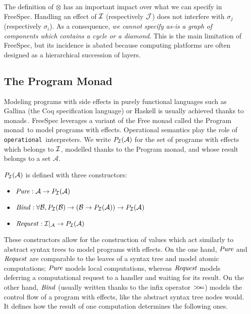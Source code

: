 The definition of $\otimes$ has an important impact over what we can specify in
FreeSpec.
%
%
Handling an effect of $\mathcal{I}$ (respectively $\mathcal{J}$) does not interfere with
$\sigma_j$ (respectively $\sigma_i$).
%
As a consequence, \emph{we cannot specify as-is a graph of components which
  contains a cycle or a diamond}.
%
This is the main limitation of FreeSpec, but its incidence is abated because
computing platforms are often designed as a hierarchical succession of layers.

\subsection{The Program Monad}

Modeling programs with side effects in purely functional languages such as
{\textsc Gallina} (the Coq specification language) or Haskell is usually
achieved thanks to monads\,\cite{hoareetal2001monad}.
%
FreeSpec leverages a variant of the Free monad called the Program
monad\,\cite{operational} to model programs with effects. Operational semantics
play the role of \texttt{operational}\,\cite{operational} interpreters.
%
We write $P_{\mathcal{I}}(\mathcal{A})$ for the set of programs with effects which
belongs to $\mathcal{I}$, modelled thanks to the Program monad, and whose result belongs
to a set $\mathcal{A}$.

\begin{definition}
  $P_{\mathcal{I}}(\mathcal{A})$ is defined with three constructors:
  \begin{itemize}
  \item $\mathit{Pure} : \mathcal{A} \rightarrow P_{\mathcal{I}}(\mathcal{A})$
  \item
    $\mathit{Bind} : \forall \mathcal{B}, P_{\mathcal{I}}(\mathcal{B}) \rightarrow
    (\mathcal{B} \rightarrow P_{\mathcal{I}}(\mathcal{A})) \rightarrow
    P_{\mathcal{I}}(\mathcal{A})$
  \item
    $\mathit{Request} : \mathcal{I}|_{\mathcal{A}} \rightarrow
    P_{\mathcal{I}}(\mathcal{A})$
  \end{itemize}
\end{definition}
%
These constructors allow for the construction of values which act similarly to
abstract syntax trees to model programs with effects.
%
On the one hand, $\mathit{Pure}$ and $\mathit{Request}$ are comparable to the leaves
of a syntax tree and model atomic computations; $\mathit{Pure}$ models local
computations, whereas $\mathit{Request}$ models deferring a computational request
to a handler and waiting for its result.
%
On the other hand, $\mathit{Bind}$ (usually written thanks to the infix operator
$>\!\!>\!\!=$) models the control flow of a program with effects, like the abstract
syntax tree nodes would.
%
It defines how the result of one computation determines the following ones.

